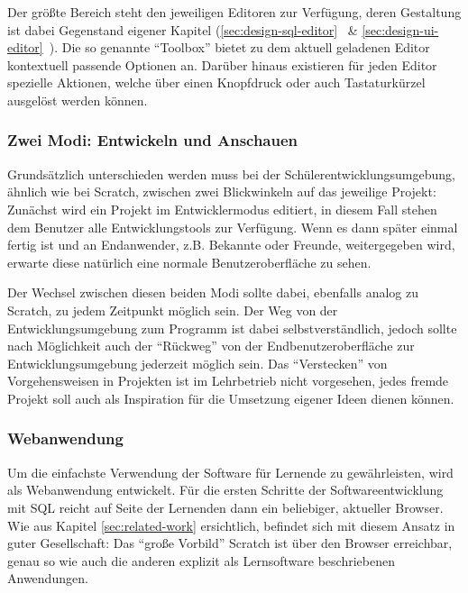 Der größte Bereich steht den jeweiligen Editoren zur Verfügung, deren Gestaltung ist dabei Gegenstand eigener Kapitel (\ref{sec:design-sql-editor}~ \& \ref{sec:design-ui-editor}~). Die so genannte "`Toolbox"' bietet zu dem aktuell geladenen Editor kontextuell passende Optionen an. Darüber hinaus existieren für jeden Editor spezielle Aktionen, welche über einen Knopfdruck oder auch Tastaturkürzel ausgelöst werden können.

\subsubsection{Zwei Modi: Entwickeln und Anschauen}

Grundsätzlich unterschieden werden muss bei der Schülerentwicklungsumgebung, ähnlich wie bei Scratch, zwischen zwei Blickwinkeln auf das jeweilige Projekt: Zunächst wird ein Projekt im Entwicklermodus editiert, in diesem Fall stehen dem Benutzer alle Entwicklungstools zur Verfügung. Wenn es dann später einmal fertig ist und an Endanwender, z.B. Bekannte oder Freunde, weitergegeben wird, erwarte diese natürlich eine normale Benutzeroberfläche zu sehen.

Der Wechsel zwischen diesen beiden Modi sollte dabei, ebenfalls analog zu Scratch, zu jedem Zeitpunkt möglich sein. Der Weg von der Entwicklungsumgebung zum Programm ist dabei selbstverständlich, jedoch sollte nach Möglichkeit auch der "`Rückweg"' von der Endbenutzeroberfläche zur Entwicklungsumgebung jederzeit möglich sein. Das "`Verstecken"' von Vorgehensweisen in Projekten ist im Lehrbetrieb nicht vorgesehen, jedes fremde Projekt soll auch als Inspiration für die Umsetzung eigener Ideen dienen können.

\subsubsection{Webanwendung}
\label{sec:req-web-application}

Um die einfachste Verwendung der Software für Lernende zu gewährleisten, wird \idename als Webanwendung entwickelt. Für die ersten Schritte der Softwareentwicklung mit SQL reicht auf Seite der Lernenden dann ein beliebiger, aktueller Browser. Wie aus Kapitel \ref{sec:related-work}  ersichtlich, befindet sich \idename mit diesem Ansatz in guter Gesellschaft: Das ``große Vorbild'' Scratch ist über den Browser erreichbar, genau so wie auch die anderen explizit als Lernsoftware beschriebenen Anwendungen.

